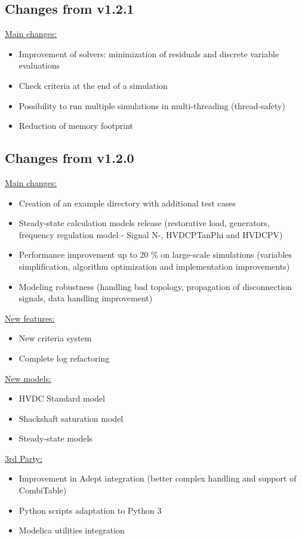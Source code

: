 \documentclass[a4paper, 12pt]{report}
\begin{document}
\subsection{Changes from v1.2.1}

\underline{Main changes:}
\begin{itemize}
\item Improvement of solvers: minimization of residuals and discrete variable evaluations
\item Check criteria at the end of a simulation
\item Possibility to run multiple simulations in multi-threading (thread-safety)
\item Reduction of memory footprint
\end{itemize}

\subsection{Changes from v1.2.0}

\underline{Main changes:}
\begin{itemize}
\item Creation of an example directory with additional test cases
\item Steady-state calculation models release (restorative load, generators, frequency regulation model - Signal N-, HVDCPTanPhi and HVDCPV)
\item Performance improvement up to 20 \% on large-scale simulations (variables simplification, algorithm optimization and implementation improvements)
\item Modeling robustness (handling bad topology, propagation of disconnection signals, data handling improvement)
\end{itemize}

\underline{New features:}
\begin{itemize}
\item New criteria system
\item Complete log refactoring
\end{itemize}

\underline{New models:}
\begin{itemize}
\item HVDC Standard model
\item Shackshaft saturation model
\item Steady-state models
\end{itemize}

\underline{3rd Party:}
\begin{itemize}
\item Improvement in Adept integration (better complex handling and support of CombiTable)
\item Python scripts adaptation to Python 3
\item Modelica utilities integration
\end{itemize}
\end{document}

